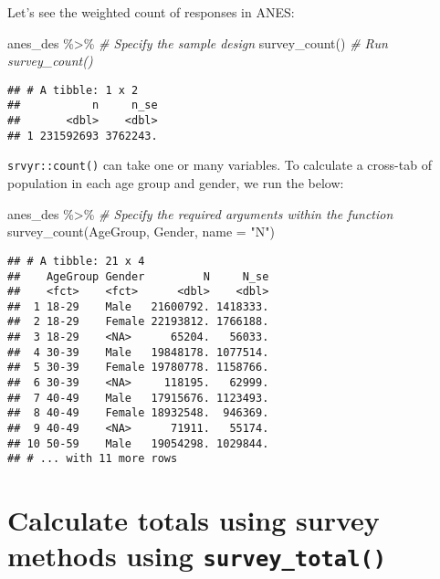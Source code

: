 \documentclass[
]{krantz}
\makeatletter
\newenvironment{Shaded}{\begin{snugshade}}{\end{snugshade}}
\newcommand{\AttributeTok}[1]{\textcolor[rgb]{0.61,0.61,0.61}{#1}}
\newcommand{\CommentTok}[1]{\textcolor[rgb]{0.37,0.37,0.37}{\textit{#1}}}
\newcommand{\FunctionTok}[1]{\textcolor[rgb]{0,0,0}{#1}}
\newcommand{\NormalTok}[1]{#1}
\newcommand{\SpecialCharTok}[1]{\textcolor[rgb]{0,0,0}{#1}}
\newcommand{\StringTok}[1]{\textcolor[rgb]{0.5,0.5,0.5}{#1}}
\newenvironment{kframe}{%
\medskip{}
\setlength{\fboxsep}{.8em}
 \def\at@end@of@kframe{}%
 \ifinner\ifhmode%
  \def\at@end@of@kframe{\end{minipage}}%
  \begin{minipage}{\columnwidth}%
 \fi\fi%
 \def\FrameCommand##1{\hskip\@totalleftmargin \hskip-\fboxsep
 \colorbox{shadecolor}{##1}\hskip-\fboxsep
     \hskip-\linewidth \hskip-\@totalleftmargin \hskip\columnwidth}%
 \MakeFramed {\advance\hsize-\width
   \@totalleftmargin\z@ \linewidth\hsize
   \@setminipage}}%
 {\par\unskip\endMakeFramed%
 \at@end@of@kframe}
\renewenvironment{Shaded}{\begin{kframe}}{\end{kframe}}
\makeatother
\begin{document}
Let's see the weighted count of responses in ANES:

\begin{Shaded}
\begin{Highlighting}[]
\NormalTok{anes\_des }\SpecialCharTok{\%\textgreater{}\%} \CommentTok{\#  Specify the sample design}
  \FunctionTok{survey\_count}\NormalTok{() }\CommentTok{\# Run \textasciigrave{}survey\_count()\textasciigrave{}}
\end{Highlighting}
\end{Shaded}

\begin{verbatim}
## # A tibble: 1 x 2
##           n     n_se
##       <dbl>    <dbl>
## 1 231592693 3762243.
\end{verbatim}

\texttt{srvyr::count()} can take one or many variables. To calculate a cross-tab of population in each age group and gender, we run the below:

\begin{Shaded}
\begin{Highlighting}[]
\NormalTok{anes\_des }\SpecialCharTok{\%\textgreater{}\%}
  \CommentTok{\# Specify the required arguments within the function}
  \FunctionTok{survey\_count}\NormalTok{(AgeGroup, Gender, }\AttributeTok{name =} \StringTok{"N"}\NormalTok{) }
\end{Highlighting}
\end{Shaded}

\begin{verbatim}
## # A tibble: 21 x 4
##    AgeGroup Gender         N     N_se
##    <fct>    <fct>      <dbl>    <dbl>
##  1 18-29    Male   21600792. 1418333.
##  2 18-29    Female 22193812. 1766188.
##  3 18-29    <NA>      65204.   56033.
##  4 30-39    Male   19848178. 1077514.
##  5 30-39    Female 19780778. 1158766.
##  6 30-39    <NA>     118195.   62999.
##  7 40-49    Male   17915676. 1123493.
##  8 40-49    Female 18932548.  946369.
##  9 40-49    <NA>      71911.   55174.
## 10 50-59    Male   19054298. 1029844.
## # ... with 11 more rows
\end{verbatim}

\hypertarget{calculate-totals-using-survey-methods-using-survey_total}{%
\section{\texorpdfstring{Calculate totals using survey methods using \texttt{survey\_total()}}{Calculate totals using survey methods using survey\_total()}}\label{calculate-totals-using-survey-methods-using-survey_total}}
\end{document}
